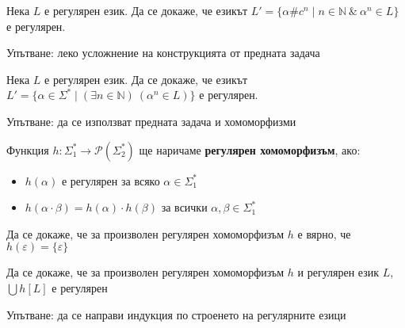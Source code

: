 \begin{problem}
Нека $L$ е регулярен език. Да се докаже, че езикът $L' = \{ \alpha \# c^n \mid n \in \mathbb{N} \: \& \: \alpha^n \in L \}$ е регулярен.

Упътване: леко усложнение на конструкцията от предната задача
\end{problem}

\begin{problem}
Нека $L$ е регулярен език. Да се докаже, че езикът $L' = \{ \alpha \in \Sigma^* \mid (\exists n \in \mathbb{N}) \: (\alpha^n \in L) \}$ е регулярен.

Упътване: да се използват предната задача и хомоморфизми
\end{problem}

\begin{definition}
    Функция $h : \Sigma_1^* \rightarrow \mathcal{P}(\Sigma_2^*)$ ще наричаме \textbf{регулярен хомоморфизъм}, ако:
    \begin{itemize}
        \item $h(\alpha)$ е регулярен за всяко $\alpha \in \Sigma_1^*$
        \item $h(\alpha \cdot \beta) = h(\alpha) \cdot h(\beta)$ за всички $\alpha, \beta \in \Sigma_1^*$
    \end{itemize}
\end{definition}

\begin{problem}
Да се докаже, че за произволен регулярен хомоморфизъм $h$ е вярно, че $h(\varepsilon) = \{ \varepsilon \}$
\end{problem}

\begin{problem}
Да се докаже, че за произволен регулярен хомоморфизъм $h$ и регулярен език $L$, $\bigcup h[L]$ е регулярен

Упътване: да се направи индукция по строенето на регулярните езици
\end{problem}